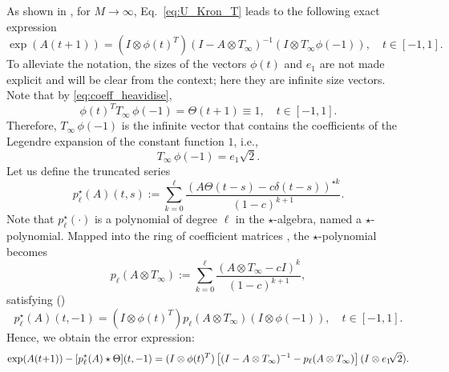 \documentclass[final,1p,times,number]{elsarticle}
\theoremstyle{plain}%
\begin{document}
As shown in \cite{Pozzxa}, for $M \rightarrow \infty$, Eq.~\eqref{eq:U_Kron_T} leads to the following exact expression
\begin{equation*}
\exp(A(t+1)) = (I \otimes \phi(t)^T) (I - A \otimes T_\infty)^{-1} (I \otimes T_\infty \phi(-1)), \quad t \in [-1, 1].
\end{equation*}
To alleviate the notation, the sizes of the vectors \(\phi(t)\) and \(e_1\) are not made explicit and will be clear from the context; here they are infinite size vectors. Note that by \eqref{eq:coeff_heavidise}, 
\[ \phi(t)^T T_\infty \,\phi(-1) = \Theta(t+1) \equiv 1, \quad t \in [-1,1].
\]
Therefore,  $T_\infty \, \phi(-1)$ is the infinite vector that contains the coefficients of the Legendre expansion of the constant function $1$, i.e.,
\begin{equation}\label{eq:e1:phi}
    T_\infty \, \phi(-1) = e_1 \sqrt{2}.
\end{equation}
Let us define the truncated series
\begin{equation}\label{eq:pl:star}
 p_\ell^\star(A)(t,s) := \sum_{k=0}^{\ell} \frac{ \left( A \Theta(t-s) - c \delta(t-s) \right)^{\star k}}{(1-c)^{k+1}}. 
 \end{equation}
Note that $p_\ell^\star(\cdot)$ is a polynomial of degree $\ell$ in the $\star$-algebra, named a $\star$-polynomial. Mapped into the ring of coefficient matrices \cite{Pozzxa}, the $\star$-polynomial becomes
\begin{equation}\label{eq:pl:mtx}
 p_\ell(A \otimes T_\infty) := \sum_{k=0}^{\ell} \frac{ \left( A \otimes T_\infty - c I \right)^{k}}{(1-c)^{k+1}},
\end{equation}
satisfying (\cite{Pozzxa})
\[p_\ell^\star(A)(t,-1) = 
 (I \otimes \phi(t)^T) p_\ell(A \otimes T_\infty)(I \otimes \phi(-1)), \quad t \in[-1,1].\]
Hence, we obtain the error expression:
\begin{align*}%
    \exp(A(t\hspace{-2pt}+\hspace{-2pt}1)) -  [p_\ell^\star(A)\star \Theta](t,-1) = (I \otimes \phi(t)^T)\left[ (I - A \otimes T_\infty)^{-1} - p_\ell(A \otimes T_\infty) \right] (I \otimes e_1 \hspace{-2pt} \sqrt{2}).
\end{align*}
\end{document}
